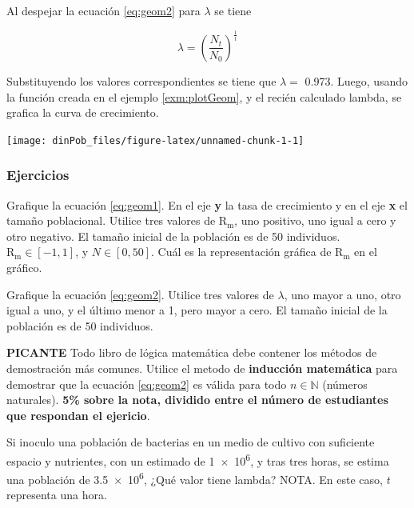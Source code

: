 \documentclass[12pt,letterpaper,]{book}
\let\BeginKnitrBlock\begin \let\EndKnitrBlock\end
\begin{document}
Al despejar la ecuación \eqref{eq:geom2} para \(\lambda\) se tiene

\[
\lambda = \left( \frac{N_t}{N_0} \right)^\frac{1}{t}
\]

Substituyendo los valores correspondientes se tiene que \(\lambda =\)
\num{ 0.973 }. Luego, usando la función creada en el ejemplo
\ref{exm:plotGeom}, y el recién calculado lambda, se grafica la curva de
crecimiento.

\begin{center}\texttt{[image: dinPob\_files/figure-latex/unnamed-chunk-1-1]} \end{center}

\subsubsection{Ejercicios}\label{ejercicios}

\BeginKnitrBlock{exercise}
\protect\hypertarget{exr:plotGeomGrowth}{}{\label{exr:plotGeomGrowth}
}Grafique la ecuación \eqref{eq:geom1}. En el eje \textbf{y} la tasa de
crecimiento y en el eje \textbf{x} el tamaño poblacional. Utilice tres
valores de \(\mathrm{R_m}\), uno positivo, uno igual a cero y otro
negativo. El tamaño inicial de la población es de 50 individuos.
\(\mathrm{R_m} \in \left[ -1, 1 \right]\), y
\(N \in \left[ 0, 50 \right]\). Cuál es la representación gráfica de
\(\mathrm{R_m}\) en el gráfico.
\EndKnitrBlock{exercise}

\BeginKnitrBlock{exercise}
\protect\hypertarget{exr:plotgeomGrowth2}{}{\label{exr:plotgeomGrowth2}
}Grafique la ecuación \eqref{eq:geom2}. Utilice tres valores de
\(\lambda\), uno mayor a uno, otro igual a uno, y el último menor a 1,
pero mayor a cero. El tamaño inicial de la población es de 50
individuos.
\EndKnitrBlock{exercise}

\BeginKnitrBlock{exercise}
\protect\hypertarget{exr:GeomGrowthMathInduction}{}{\label{exr:GeomGrowthMathInduction}
}\textbf{PICANTE} Todo libro de lógica matemática debe contener los
métodos de demostración más comunes. Utilice el metodo de
\textbf{inducción matemática} para demostrar que la ecuación
\eqref{eq:geom2} es válida para todo \(n \in \mathbb{N}\) (números
naturales). \textbf{5\% sobre la nota, dividido entre el número de
estudiantes que respondan el ejericio}.
\EndKnitrBlock{exercise}

\BeginKnitrBlock{exercise}
\protect\hypertarget{exr:GeomGrowthBacteria1}{}{\label{exr:GeomGrowthBacteria1}
}Si inoculo una población de bacterias en un medio de cultivo con
suficiente espacio y nutrientes, con un estimado de
\SI{1e6}{}, y tras tres horas, se estima una población
de \SI{3.5e6}{}, ¿Qué valor tiene lambda? NOTA. En este
caso, \(t\) representa una hora.
\EndKnitrBlock{exercise}
\end{document}
